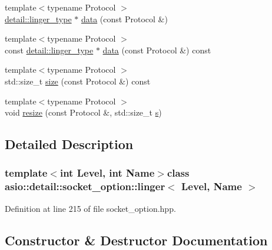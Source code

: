 \begin{DoxyCompactItemize}
\item 
{\footnotesize template$<$typename Protocol $>$ }\\\hyperlink{namespaceasio_1_1detail_a417cb909eef0654a2e53adc1f4dd2dc1}{detail\+::linger\+\_\+type} $\ast$ \hyperlink{classasio_1_1detail_1_1socket__option_1_1linger_a89a904b9b46745951391956d563721f6}{data} (const Protocol \&)
\item 
{\footnotesize template$<$typename Protocol $>$ }\\const \hyperlink{namespaceasio_1_1detail_a417cb909eef0654a2e53adc1f4dd2dc1}{detail\+::linger\+\_\+type} $\ast$ \hyperlink{classasio_1_1detail_1_1socket__option_1_1linger_afb8f8f39249262fe3e1f9ddc9f62f2e4}{data} (const Protocol \&) const 
\item 
{\footnotesize template$<$typename Protocol $>$ }\\std\+::size\+\_\+t \hyperlink{classasio_1_1detail_1_1socket__option_1_1linger_af625a09cf1f390654b2d4ef98014dbf8}{size} (const Protocol \&) const 
\item 
{\footnotesize template$<$typename Protocol $>$ }\\void \hyperlink{classasio_1_1detail_1_1socket__option_1_1linger_a2eb07ca2b3257d1460fdcf5d0e126647}{resize} (const Protocol \&, std\+::size\+\_\+t \hyperlink{group__async__connect_ga31ab74b9ea6c77932dddd016cfc7920a}{s})
\end{DoxyCompactItemize}


\subsection{Detailed Description}
\subsubsection*{template$<$int Level, int Name$>$class asio\+::detail\+::socket\+\_\+option\+::linger$<$ Level, Name $>$}



Definition at line 215 of file socket\+\_\+option.\+hpp.



\subsection{Constructor \& Destructor Documentation}
\hypertarget{classasio_1_1detail_1_1socket__option_1_1linger_a3ba41e1cb8fdaac33e80cee84dd8992a}{}
